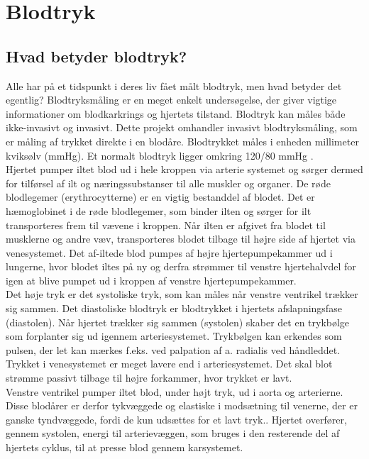\chapter{Blodtryk}
\section{Hvad betyder blodtryk?} 
Alle har på et tidspunkt i deres liv fået målt blodtryk, men hvad betyder det egentlig?
Blodtryksmåling er en meget enkelt undersøgelse, der giver vigtige informationer om blodkarkrings og hjertets tilstand. Blodtryk kan måles både ikke-invasivt og invasivt. Dette projekt omhandler invasivt blodtryksmåling, som er måling af trykket direkte i en blodåre. 
Blodtrykket måles i enheden millimeter kviksølv (mmHg). Et normalt blodtryk ligger omkring 120/80 mmHg \cite{Blodtryk}. \\ 
Hjertet pumper iltet blod ud i hele kroppen via arterie systemet og sørger dermed for tilførsel af ilt og næringssubstanser til alle muskler og organer. De røde blodlegemer (erythrocytterne) er en vigtig bestanddel af blodet. Det er hæmoglobinet i de røde blodlegemer, som binder ilten og sørger for ilt transporteres frem til vævene i kroppen. Når ilten er afgivet fra blodet til musklerne og andre væv, transporteres blodet tilbage til højre side af hjertet via venesystemet. Det af-iltede blod pumpes af højre hjertepumpekammer ud i lungerne, hvor blodet iltes på ny og derfra strømmer til venstre hjertehalvdel for igen at blive pumpet ud i kroppen af venstre hjertepumpekammer. \\
Det høje tryk er det systoliske tryk, som kan måles når venstre ventrikel trækker sig sammen. Det diastoliske blodtryk er blodtrykket i hjertets afslapningsfase (diastolen). Når hjertet trækker sig sammen (systolen) skaber det en trykbølge som forplanter sig ud igennem arteriesystemet. Trykbølgen kan erkendes som pulsen, der let kan mærkes f.eks. ved palpation af a. radialis ved håndleddet. Trykket i venesystemet er meget lavere end i arteriesystemet. Det skal blot strømme passivt tilbage til højre forkammer, hvor trykket er lavt. \\
Venstre ventrikel pumper iltet blod, under højt tryk, ud i aorta og arterierne. Disse blodårer er derfor tykvæggede og elastiske i modsætning til venerne, der er ganske tyndvæggede, fordi de kun udsættes for et lavt tryk.. Hjertet overfører, gennem systolen, energi til arterievæggen, som bruges i den resterende del af hjertets cyklus, til at presse blod gennem karsystemet. 



